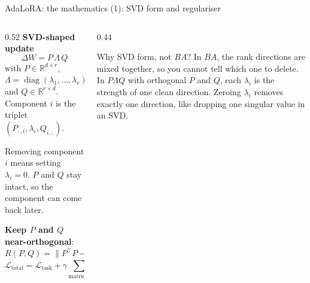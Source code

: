 \documentclass[aspectratio=169,11pt]{beamer}
\begin{document}
\begin{frame}{AdaLoRA: the mathematics (1): SVD form and regulariser}
  \begin{columns}[T]
    \begin{column}{0.52\textwidth}
      \small
      \textbf{SVD-shaped update}
      \[
        \Delta W = P\,\Lambda\,Q
      \]
      with $P\in\mathbb{R}^{d\times r}$, $\Lambda=\operatorname{diag}(\lambda_1,\ldots,\lambda_r)$ and $Q\in\mathbb{R}^{r\times d}$.
      Component $i$ is the triplet $(P_{:,i},\lambda_i,Q_{i,:})$.
      \vspace{1mm}

      Removing component $i$ means setting $\lambda_i=0$. $P$ and $Q$ stay intact, so the component can come back later.
      \vspace{1mm}

      \textbf{Keep $P$ and $Q$ near-orthogonal}:
      \[
        R(P,Q)=\|P^\top P-I\|_F^2+\|QQ^\top-I\|_F^2
      \]
      \[
        \mathcal{L}_{\text{total}}=\mathcal{L}_{\text{task}}+\gamma\textstyle\sum_{\text{matrices}}R(P,Q)
      \]
    \end{column}
    \begin{column}{0.44\textwidth}
      \begin{exampleblock}{Why SVD form, not $BA$?}
        \small
        In $BA$, the rank directions are mixed together, so you cannot tell which one to delete.
        In $P\Lambda Q$ with orthogonal $P$ and $Q$, each $\lambda_i$ is the strength of one clean direction.
        Zeroing $\lambda_i$ removes exactly one direction, like dropping one singular value in an SVD.
      \end{exampleblock}
    \end{column}
  \end{columns}
\end{frame}
\end{document}
